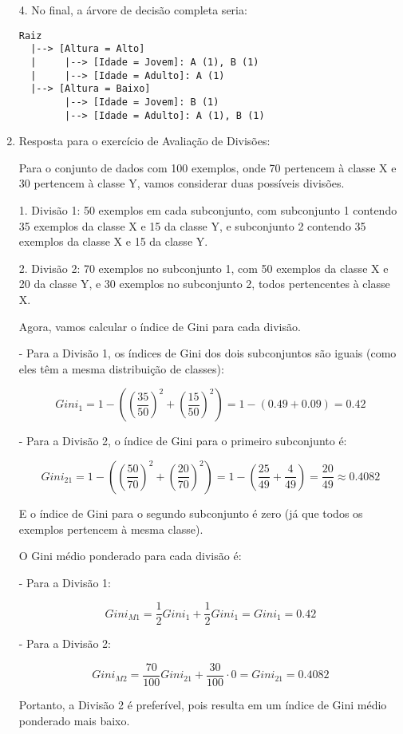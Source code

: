 \documentclass[12pt,a4paper, brazil]{article}
\begin{document}
\begin{enumerate}
4. No final, a árvore de decisão completa seria:

\begin{verbatim}
Raiz
  |--> [Altura = Alto]
  |     |--> [Idade = Jovem]: A (1), B (1)
  |     |--> [Idade = Adulto]: A (1)
  |--> [Altura = Baixo]
        |--> [Idade = Jovem]: B (1)
        |--> [Idade = Adulto]: A (1), B (1)
\end{verbatim}

\item Resposta para o exercício de Avaliação de Divisões:

Para o conjunto de dados com 100 exemplos, onde 70 pertencem à classe X e 30 pertencem à classe Y, vamos considerar duas possíveis divisões.

1. Divisão 1: 50 exemplos em cada subconjunto, com subconjunto 1 contendo 35 exemplos da classe X e 15 da classe Y, e subconjunto 2 contendo 35 exemplos da classe X e 15 da classe Y.

2. Divisão 2: 70 exemplos no subconjunto 1, com 50 exemplos da classe X e 20 da classe Y, e 30 exemplos no subconjunto 2, todos pertencentes à classe X.

Agora, vamos calcular o índice de Gini para cada divisão.

- Para a Divisão 1, os índices de Gini dos dois subconjuntos são iguais (como eles têm a mesma distribuição de classes):

\[
Gini_1 = 1 - \left(\left(\frac{35}{50}\right)^2 + \left(\frac{15}{50}\right)^2\right) = 1 - \left(0.49 + 0.09\right) = 0.42
\]

- Para a Divisão 2, o índice de Gini para o primeiro subconjunto é:

\[
Gini_{21} = 1 - \left(\left(\frac{50}{70}\right)^2 + \left(\frac{20}{70}\right)^2\right) = 1 - \left(\frac{25}{49} + \frac{4}{49}\right) = \frac{20}{49} \approx 0.4082
\]

E o índice de Gini para o segundo subconjunto é zero (já que todos os exemplos pertencem à mesma classe).

O Gini médio ponderado para cada divisão é:

- Para a Divisão 1:

\[
Gini_{M1} = \frac{1}{2} Gini_1 + \frac{1}{2} Gini_1 = Gini_1 = 0.42
\]

- Para a Divisão 2:

\[
Gini_{M2} = \frac{70}{100} Gini_{21} + \frac{30}{100} \cdot 0 = Gini_{21} = 0.4082
\]

Portanto, a Divisão 2 é preferível, pois resulta em um índice de Gini médio ponderado mais baixo.


\end{enumerate}


\printbibliography
\end{document}
